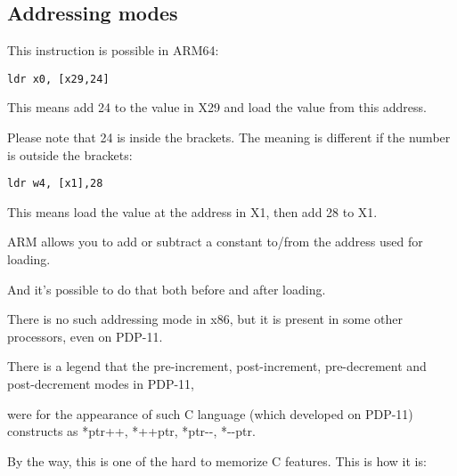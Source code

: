﻿\subsection{Addressing modes}
\label{ARM_postindex_vs_preindex}
\myindex{\CLanguageElements!\PostIncrement}
\myindex{\CLanguageElements!\PostDecrement}
\myindex{\CLanguageElements!\PreIncrement}
\myindex{\CLanguageElements!\PreDecrement}

This instruction is possible in ARM64:

\begin{lstlisting}[style=customasmARM]
ldr	x0, [x29,24]
\end{lstlisting}

This means add 24 to the value in X29 and load the value from this address.

Please note that 24 is inside the brackets.
The meaning is different if the number is outside the brackets:

\begin{lstlisting}[style=customasmARM]
ldr	w4, [x1],28
\end{lstlisting}

This means load the value at the address in X1, then add 28 to X1.


ARM allows you to add or subtract a constant to/from the address used for loading.

And it's possible to do that both before and after loading.

There is no such addressing mode in x86, but it is present in some other processors, even on PDP-11.

There is a legend that the pre-increment, post-increment, pre-decrement and post-decrement modes in PDP-11,

were  for the appearance of such C language (which developed on PDP-11) constructs as
*ptr++, *++ptr, *ptr-{}-, *-{}-ptr. 

By the way, this is one of the hard to memorize C features.
This is how it is:

